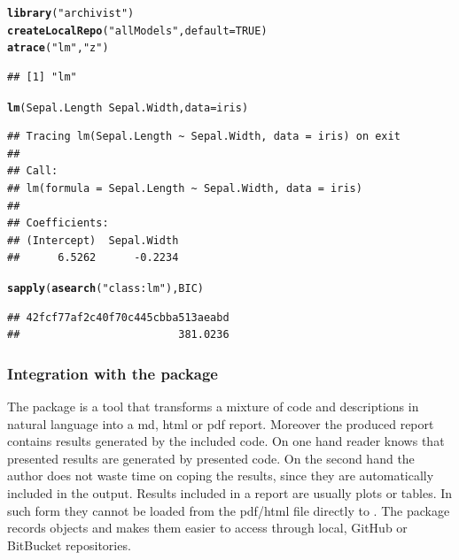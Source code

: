 \documentclass[nojss]{jss}\usepackage[]{graphicx}\usepackage[]{color}
\makeatletter
\newcommand{\hlnum}[1]{\textcolor[rgb]{0.686,0.059,0.569}{#1}}%
\newcommand{\hlstr}[1]{\textcolor[rgb]{0.192,0.494,0.8}{#1}}%
\newcommand{\hlopt}[1]{\textcolor[rgb]{0,0,0}{#1}}%
\newcommand{\hlstd}[1]{\textcolor[rgb]{0.345,0.345,0.345}{#1}}%
\newcommand{\hlkwc}[1]{\textcolor[rgb]{0.333,0.667,0.333}{#1}}%
\newcommand{\hlkwd}[1]{\textcolor[rgb]{0.737,0.353,0.396}{\textbf{#1}}}%
\newenvironment{kframe}{%
 \def\at@end@of@kframe{}%
 \ifinner\ifhmode%
  \def\at@end@of@kframe{\end{minipage}}%
  \begin{minipage}{\columnwidth}%
 \fi\fi%
 \def\FrameCommand##1{\hskip\@totalleftmargin \hskip-\fboxsep
 \colorbox{shadecolor}{##1}\hskip-\fboxsep
     \hskip-\linewidth \hskip-\@totalleftmargin \hskip\columnwidth}%
 \MakeFramed {\advance\hsize-\width
   \@totalleftmargin\z@ \linewidth\hsize
   \@setminipage}}%
 {\par\unskip\endMakeFramed%
 \at@end@of@kframe}
\newenvironment{knitrout}{}{} %
\makeatother
\begin{document}
\begin{knitrout}
\color{fgcolor}\begin{kframe}
\begin{alltt}
\hlkwd{library}\hlstd{(}\hlstr{"archivist"}\hlstd{)}
\hlkwd{createLocalRepo}\hlstd{(}\hlstr{"allModels"}\hlstd{,} \hlkwc{default} \hlstd{=} \hlnum{TRUE}\hlstd{)}
\hlkwd{atrace}\hlstd{(}\hlstr{"lm"}\hlstd{,} \hlstr{"z"}\hlstd{)}
\end{alltt}


{\ttfamily\noindent\itshape{}}\begin{verbatim}
## [1] "lm"
\end{verbatim}
\begin{alltt}
\hlkwd{lm}\hlstd{(Sepal.Length} \hlopt{~} \hlstd{Sepal.Width,} \hlkwc{data}\hlstd{=iris)}
\end{alltt}
\begin{verbatim}
## Tracing lm(Sepal.Length ~ Sepal.Width, data = iris) on exit
## 
## Call:
## lm(formula = Sepal.Length ~ Sepal.Width, data = iris)
## 
## Coefficients:
## (Intercept)  Sepal.Width  
##      6.5262      -0.2234
\end{verbatim}
\begin{alltt}
\hlkwd{sapply}\hlstd{(}\hlkwd{asearch}\hlstd{(}\hlstr{"class:lm"}\hlstd{), BIC)}
\end{alltt}
\begin{verbatim}
## 42fcf77af2c40f70c445cbba513aeabd 
##                         381.0236
\end{verbatim}
\end{kframe}
\end{knitrout}

\subsubsection[Integration with the knitr package]{Integration with the  package}

The  package is a tool that transforms a mixture of  code and descriptions in natural language into a md, html or pdf report. Moreover the produced report contains results generated by the included  code. On one hand reader knows that presented results are generated by presented code. On the second hand the author does not waste time on coping the results, since they are automatically included in the output. Results included in a report are usually plots or tables. In such form they cannot be loaded from the pdf/html file directly to .
The  package records objects and makes them easier to access through local, GitHub or BitBucket repositories.
\end{document}
